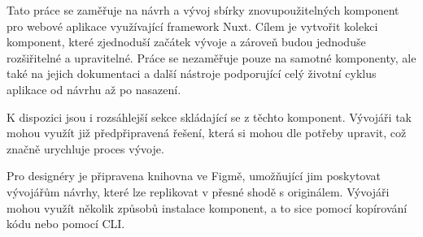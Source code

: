 
Tato práce se zaměřuje na návrh a vývoj sbírky znovupoužitelných komponent pro webové aplikace využívající framework Nuxt.
Cílem je vytvořit kolekci komponent, které zjednoduší začátek vývoje a zároveň budou jednoduše rozšiřitelné a upravitelné.
Práce se nezaměřuje pouze na samotné komponenty, ale také na jejich dokumentaci a další nástroje podporující celý životní
cyklus aplikace od návrhu až po nasazení.

K dispozici jsou i rozsáhlejší sekce skládající se z těchto komponent. Vývojáři tak mohou využít již předpřipravená řešení,
která si mohou dle potřeby upravit, což značně urychluje proces vývoje.

Pro designéry je připravena knihovna ve Figmě, umožňující jim poskytovat vývojářům návrhy, které lze replikovat v přesné
shodě s originálem. Vývojáři mohou využít několik způsobů instalace komponent, a to sice pomocí kopírování kódu nebo pomocí CLI.

